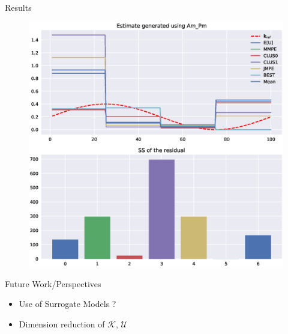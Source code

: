 \documentclass{beamer}
\newlength{\thirdcolwid}
\begin{document}
\begin{frame}[t]
\begin{columns}[t]
\begin{column}{\thirdcolwid}
\begin{block}{Results}
\begin{figure}[!h]
  \centering
\includegraphics[width=0.85\linewidth]{estimate_Am_Pm}
\end{figure}


\end{block}


\begin{block}{Future Work/Perspectives}
  \begin{itemize}
  \item Use of \alert{Surrogate Models} ?
  \item \alert{Dimension reduction} of $\mathcal{K}$, $\mathcal{U}$
  \end{itemize}
\end{block}


\end{column}
\end{columns}
\end{frame}
\end{document}
